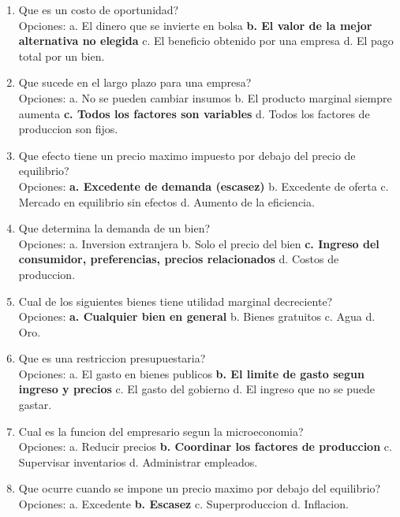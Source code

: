 \documentclass[
	spanish,
	letterpaper, oneside
]{article}
\begin{document}
\begin{enumerate}
	\item Que es un costo de oportunidad?\\
	Opciones: a. El dinero que se invierte en bolsa \quad \textbf{b. El valor de la mejor alternativa no elegida} \quad c. El beneficio obtenido por una empresa \quad d. El pago total por un bien.

	\item Que sucede en el largo plazo para una empresa?\\
	Opciones: a. No se pueden cambiar insumos \quad b. El producto marginal siempre aumenta \quad \textbf{c. Todos los factores son variables} \quad d. Todos los factores de produccion son fijos.

	\item Que efecto tiene un precio maximo impuesto por debajo del precio de equilibrio?\\
	Opciones: \textbf{a. Excedente de demanda (escasez)} \quad b. Excedente de oferta \quad c. Mercado en equilibrio sin efectos \quad d. Aumento de la eficiencia.

	\item Que determina la demanda de un bien?\\
	Opciones: a. Inversion extranjera \quad b. Solo el precio del bien \quad \textbf{c. Ingreso del consumidor, preferencias, precios relacionados} \quad d. Costos de produccion.

	\item Cual de los siguientes bienes tiene utilidad marginal decreciente?\\
	Opciones: \textbf{a. Cualquier bien en general} \quad b. Bienes gratuitos \quad c. Agua \quad d. Oro.

	\item Que es una restriccion presupuestaria?\\
	Opciones: a. El gasto en bienes publicos \quad \textbf{b. El limite de gasto segun ingreso y precios} \quad c. El gasto del gobierno \quad d. El ingreso que no se puede gastar.

	\item Cual es la funcion del empresario segun la microeconomia?\\
	Opciones: a. Reducir precios \quad \textbf{b. Coordinar los factores de produccion} \quad c. Supervisar inventarios \quad d. Administrar empleados.

	\item Que ocurre cuando se impone un precio maximo por debajo del equilibrio?\\
	Opciones: a. Excedente \quad \textbf{b. Escasez} \quad c. Superproduccion \quad d. Inflacion.
\end{enumerate}
\end{document}
